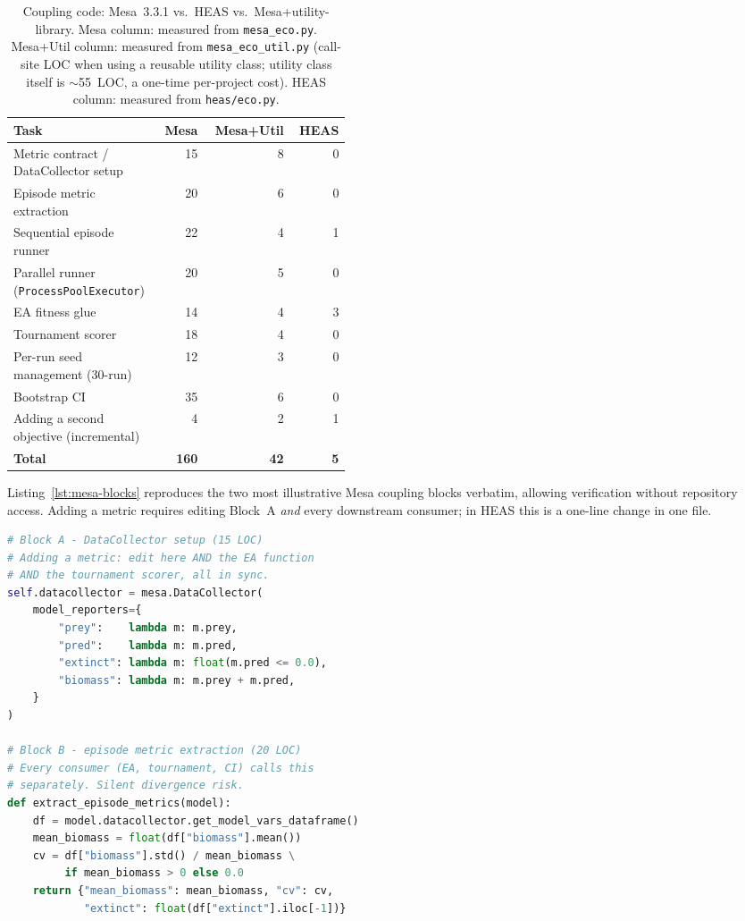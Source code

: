 \documentclass{wscpaperproc}
\begin{document}
\begin{table}[ht]
\caption{Coupling code: Mesa~3.3.1 vs.\ HEAS vs.\ Mesa+utility-library.
  Mesa column: measured from \texttt{mesa\_eco.py}.
  Mesa+Util column: measured from \texttt{mesa\_eco\_util.py} (call-site LOC
  when using a reusable utility class; utility class itself is $\sim$55~LOC,
  a one-time per-project cost). HEAS column: measured from \texttt{heas/eco.py}.}
\label{tab:loc}
\centering\small
\begin{tabular}{p{0.44\linewidth}rrr}
\toprule
Task & Mesa & Mesa+Util & HEAS \\
\midrule
Metric contract / DataCollector setup   & 15 & 8  & 0 \\
Episode metric extraction               & 20 & 6  & 0 \\
Sequential episode runner               & 22 & 4  & 1 \\
Parallel runner (\texttt{ProcessPoolExecutor}) & 20 & 5  & 0 \\
EA fitness glue                         & 14 & 4  & 3 \\
Tournament scorer                       & 18 & 4  & 0 \\
Per-run seed management (30-run)        & 12 & 3  & 0 \\
Bootstrap CI                            & 35 & 6  & 0 \\
Adding a second objective (incremental) & 4  & 2  & 1 \\
\midrule
\textbf{Total}                          & \textbf{160} & \textbf{42} & \textbf{5} \\
\bottomrule
\end{tabular}
\end{table}

Listing~\ref{lst:mesa-blocks} reproduces the two most illustrative
Mesa coupling blocks verbatim, allowing verification without repository
access. Adding a metric requires editing Block~A \emph{and} every downstream
consumer; in HEAS this is a one-line change in one file.

\begin{lstlisting}[caption={Mesa coupling code Blocks A and B (35 LOC from
    \texttt{experiments/mesa\_eco.py}). HEAS equivalent: zero LOC.},
    label=lst:mesa-blocks, language=Python]
# Block A - DataCollector setup (15 LOC)
# Adding a metric: edit here AND the EA function
# AND the tournament scorer, all in sync.
self.datacollector = mesa.DataCollector(
    model_reporters={
        "prey":    lambda m: m.prey,
        "pred":    lambda m: m.pred,
        "extinct": lambda m: float(m.pred <= 0.0),
        "biomass": lambda m: m.prey + m.pred,
    }
)

# Block B - episode metric extraction (20 LOC)
# Every consumer (EA, tournament, CI) calls this
# separately. Silent divergence risk.
def extract_episode_metrics(model):
    df = model.datacollector.get_model_vars_dataframe()
    mean_biomass = float(df["biomass"].mean())
    cv = df["biomass"].std() / mean_biomass \
         if mean_biomass > 0 else 0.0
    return {"mean_biomass": mean_biomass, "cv": cv,
            "extinct": float(df["extinct"].iloc[-1])}
\end{lstlisting}
\end{document}
